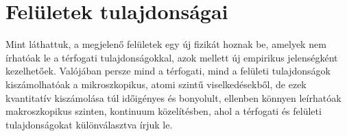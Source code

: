 \documentclass[12pt,a4paper]{scrartcl}
\begin{document}
\section{Felületek tulajdonságai}
Mint láthattuk, a megjelenő felületek egy új fizikát hoznak be, amelyek nem írhatóak le a térfogati tulajdonságokkal, azok mellett új empirikus jelenségként kezelhetőek. Valójában persze mind a térfogati, mind a felületi tulajdonságok kiszámolhatóak a mikroszkopikus, atomi szintű viselkedésekből, de ezek kvantitatív kiszámolása túl időigényes és bonyolult, ellenben könnyen leírhatóak makroszkopikus szinten, kontinuum közelítésben, ahol a térfogati és felületi tulajdonságokat különválasztva írjuk le.
\end{document}
